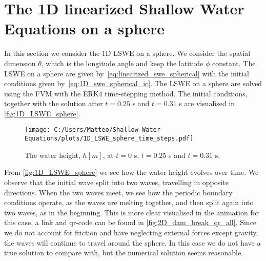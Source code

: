 \section{The 1D linearized Shallow Water Equations on a sphere}\label{sec:1D_sphere}
In this section we consider the 1D LSWE on a sphere.
We consider the spatial dimension $\theta$, which is the longitude angle and keep the latitude $\phi$ constant.
The LSWE on a sphere are given by~\eqref{eq:linearized_swe_spherical} with the initial conditions given by~\eqref{eq:1D_swe_spherical_ic}.
The LSWE on a sphere are solved using the FVM with the ERK4 time-stepping method.
The initial conditions, together with the solution after $t = 0.25$ s and $t = 0.31$ s are visualised in \autoref{fig:1D_LSWE_sphere}.
\begin{figure}[H]
    \centering
    \texttt{[image: C:/Users/Matteo/Shallow-Water-Equations/plots/1D\_LSWE\_sphere\_time\_steps.pdf]}
    \caption{The water height, $h[m]$, at $t = 0$ s, $t = 0.25$ s and $t = 0.31$ s.}\label{fig:1D_LSWE_sphere}
\end{figure}
From \autoref{fig:1D_LSWE_sphere} we see how the water height evolves over time.
We observe that the initial wave split into two waves, travelling in opposite directions.
When the two waves meet, we see how the periodic boundary conditions operate, as the waves are melting together, and then split again into two waves, as in the beginning.
This is more clear visualised in the animation for this case, a link and qr-code can be found in \autoref{fig:2D_dam_break_qr_all}.
Since we do not account for friction and have neglecting external forces except gravity, the waves will continue to travel around the sphere.
In this case we do not have a true solution to compare with, but the numerical solution seems reasonable.

